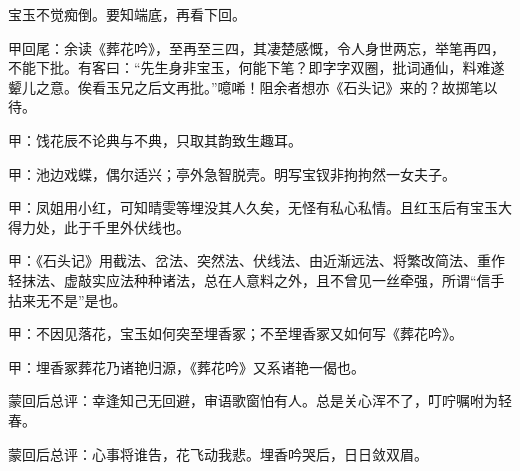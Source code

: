 \begin{parag}
    宝玉不觉痴倒。要知端底，再看下回。
\end{parag}


\begin{parag}
    \begin{note}甲回尾：余读《葬花吟》，至再至三四，其凄楚感慨，令人身世两忘，举笔再四，不能下批。有客曰：“先生身非宝玉，何能下笔？即字字双圈，批词通仙，料难遂颦儿之意。俟看玉兄之后文再批。”噫唏！阻余者想亦《石头记》来的？故掷笔以待。\end{note}
\end{parag}


\begin{parag}
    \begin{note}甲：饯花辰不论典与不典，只取其韵致生趣耳。\end{note}
\end{parag}


\begin{parag}
    \begin{note}甲：池边戏蝶，偶尔适兴；亭外急智脱壳。明写宝钗非拘拘然一女夫子。\end{note}
\end{parag}


\begin{parag}
    \begin{note}甲：凤姐用小红，可知晴雯等埋没其人久矣，无怪有私心私情。且红玉后有宝玉大得力处，此于千里外伏线也。\end{note}
\end{parag}


\begin{parag}
    \begin{note}甲：《石头记》用截法、岔法、突然法、伏线法、由近渐远法、将繁改简法、重作轻抹法、虚敲实应法种种诸法，总在人意料之外，且不曾见一丝牵强，所谓“信手拈来无不是”是也。\end{note}
\end{parag}


\begin{parag}
    \begin{note}甲：不因见落花，宝玉如何突至埋香冢；不至埋香冢又如何写《葬花吟》。\end{note}
\end{parag}


\begin{parag}
    \begin{note}甲：埋香冢葬花乃诸艳归源，《葬花吟》又系诸艳一偈也。\end{note}
\end{parag}


\begin{parag}
    \begin{note}蒙回后总评：幸逢知己无回避，审语歌窗怕有人。总是关心浑不了，叮咛嘱咐为轻春。\end{note}
\end{parag}


\begin{parag}
    \begin{note}蒙回后总评：心事将谁告，花飞动我悲。埋香吟哭后，日日敛双眉。\end{note}
\end{parag}

